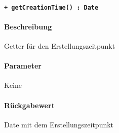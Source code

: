 \paragraph{\texttt{+ getCreationTime() : Date}}%
\paragraph*{Beschreibung}
Getter für den Erstellungszeitpunkt
\paragraph*{Parameter}
Keine
\paragraph*{Rückgabewert}
Date mit dem Erstellungszeitpunkt